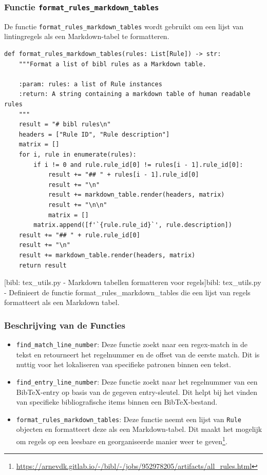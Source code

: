 \subsubsection{Functie \texttt{format\_rules\_markdown\_tables}}

De functie \texttt{format\_rules\_markdown\_tables} wordt gebruikt om een lijst van lintingregels als een Markdown-tabel te formatteren.

\begin{verbatim}
def format_rules_markdown_tables(rules: List[Rule]) -> str:
    """Format a list of bibl rules as a Markdown table.

    :param: rules: a list of Rule instances
    :return: A string containing a markdown table of human readable rules
    """
    result = "# bibl rules\n"
    headers = ["Rule ID", "Rule description"]
    matrix = []
    for i, rule in enumerate(rules):
        if i != 0 and rule.rule_id[0] != rules[i - 1].rule_id[0]:
            result += "## " + rules[i - 1].rule_id[0]
            result += "\n"
            result += markdown_table.render(headers, matrix)
            result += "\n\n"
            matrix = []
        matrix.append([f'`{rule.rule_id}`', rule.description])
    result += "## " + rule.rule_id[0]
    result += "\n"
    result += markdown_table.render(headers, matrix)
    return result
\end{verbatim}
[bibl: tex\_utils.py - Markdown tabellen formatteren voor regels]{bibl: tex\_utils.py - Definieert de functie format\_rules\_markdown\_tables die een lijst van regels formatteert als een Markdown tabel. \label{lst:bibl_tex_utils_format_rules}}

\subsubsection{Beschrijving van de Functies}

\begin{itemize}
    \item \texttt{find\_match\_line\_number}: Deze functie zoekt naar een regex-match in de tekst en retourneert het regelnummer en de offset van de eerste match. Dit is nuttig voor het lokaliseren van specifieke patronen binnen een tekst.
    \item \texttt{find\_entry\_line\_number}: Deze functie zoekt naar het regelnummer van een BibTeX-entry op basis van de gegeven entry-sleutel. Dit helpt bij het vinden van specifieke bibliografische items binnen een BibTeX-bestand.
    \item \texttt{format\_rules\_markdown\_tables}: Deze functie neemt een lijst van \texttt{Rule} objecten en formatteert deze als een Markdown-tabel. Dit maakt het mogelijk om regels op een leesbare en georganiseerde manier weer te geven\footnote{\url{https://arnevdk.gitlab.io/-/bibl/-/jobs/952978205/artifacts/all_rules.html}}.
\end{itemize}

